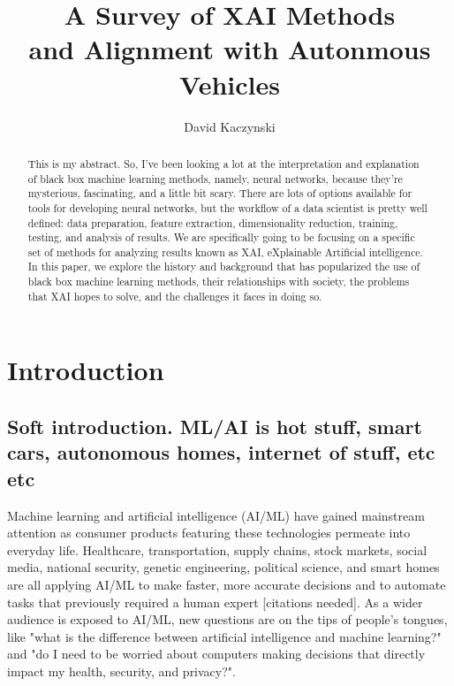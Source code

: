 \documentclass{IEEEtran}
\begin{document}
\title{A Survey of XAI Methods\\and Alignment with Autonmous Vehicles}
\author{David Kaczynski}
\maketitle

\begin{abstract}
This is my abstract.  So, I've been looking a lot at the interpretation and explanation of black box machine learning methods, namely, neural networks, because they're mysterious, fascinating, and a little bit scary.  There are lots of options available for tools for developing neural networks, but the workflow of a data scientist is pretty well defined:  data preparation, feature extraction, dimensionality reduction, training, testing, and analysis of results.  We are specifically going to be focusing on a specific set of methods for analyzing results known as XAI, eXplainable Artificial intelligence.  In this paper, we explore the history and background that has popularized the use of black box machine learning methods, their relationships with society, the problems that XAI hopes to solve, and the challenges it faces in doing so.
\end{abstract}

\section{Introduction}

\subsection{Soft introduction.  ML/AI is hot stuff, smart cars, autonomous homes, internet of stuff, etc etc}

Machine learning and artificial intelligence (AI/ML) have gained mainstream attention as consumer products featuring these technologies permeate into everyday life.  Healthcare, transportation, supply chains, stock markets, social media, national security, genetic engineering, political science, and smart homes are all applying AI/ML to make faster, more accurate decisions and to automate tasks that previously required a human expert [citations needed].  As a wider audience is exposed to AI/ML, new questions are on the tips of people's tongues, like "what is the difference between artificial intelligence and machine learning?" and "do I need to be worried about computers making decisions that directly impact my health, security, and privacy?".
\end{document}

